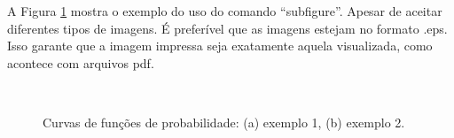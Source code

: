 A Figura \ref{Fig:1} mostra o exemplo do uso do comando ``subfigure''. Apesar de aceitar diferentes tipos de imagens. É preferível que as imagens estejam no formato .eps. Isso garante que a imagem impressa seja exatamente aquela visualizada, como acontece com arquivos pdf.

\begin{figure}[!ht]
\centering
{}\\
\caption{ Curvas de funções de probabilidade: (a) exemplo 1, (b) exemplo 2.} \label{Fig:1}
\end{figure}